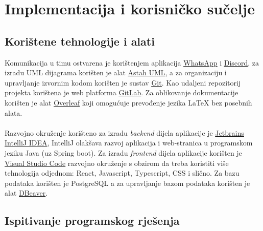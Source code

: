 
\chapter{Implementacija i korisničko sučelje}
		
		
		\section{Korištene tehnologije i alati}
		
			
            Komunikacija u timu ostvarena je korištenjem aplikacija \underline{\href{https://web.whatsapp.com/}{WhatsApp}} i \underline{\href{https://discord.com/}{Discord}}, za izradu UML dijagrama korišten je alat \underline{\href{https://astah.net/}{Astah UML}}, a za organizaciju i upravljanje izvornim kodom korišten je sustav \underline{\href{https://git-scm.com/}{Git}}. Kao udaljeni repozitorij projekta korištena je web platforma \underline{\href{https://gitlab.com/}{GitLab}}. Za oblikovanje dokumentacije korišten je alat \underline{\href{www.overleaf.com}{Overleaf}} koji omogućuje prevođenje jezika LaTeX bez posebnih alata.
            \\
            \\
            Razvojno okruženje korišteno za izradu \textit{backend} dijela aplikacije je \underline{\href{https://www.jetbrains.com/idea/}{Jetbrains IntelliJ IDEA}}, IntelliJ olakšava razvoj aplikacija i web-stranica u programskom jeziku Java (uz Spring boot). Za izradu \textit{frontend} dijela aplikacije korišten je \underline{\href{https://code.visualstudio.com/}{Visual Studio Code}} razvojno okruženje s obzirom da treba koristiti više tehnologija odjednom: React, Javascript, Typescript, CSS i slično.
            Za bazu podataka korišten je PostgreSQL a za upravljanje bazom podataka korišten je alat \underline{\href{https://dbeaver.io/}{DBeaver}}.
			
			
			\eject 
		
	
		\section{Ispitivanje programskog rješenja}
			
